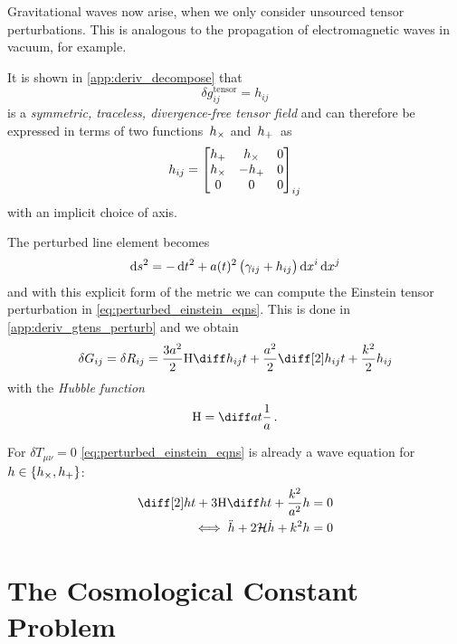 \documentclass[parskip=half]{scrreprt}
\begin{document}
Gravitational waves now arise, when we only consider unsourced tensor perturbations. This is analogous to the propagation of electromagnetic waves in vacuum, for example.

It is shown in \autoref{app:deriv_decompose} that
\begin{equation}
	\delta g^{\mathrm{tensor}}_{ij} = h_{ij}
\end{equation}
is a \emph{symmetric, traceless, divergence-free tensor field} and can therefore be expressed in terms of two functions~\(h_\times\) and~\(h_+\)~as
\begin{equation}
	h_{ij} =
	\begin{bmatrix}
		h_+ & h_\times & 0 \\
		h_\times & -h_+ & 0 \\
		0 & 0 & 0
	\end{bmatrix}_{ij}
\end{equation}
with an implicit choice of axis.

The perturbed line element becomes
\begin{equation}
	\dif{s}^2 = -\dif{t}^2 + a(t)^2 \del{\gamma_{ij} + h_{ij}} \dif{x^i}\dif{x^j}
\end{equation}
and with this explicit form of the metric we can compute the Einstein tensor perturbation in \autoref{eq:perturbed_einstein_eqns}. This is done in \autoref{app:deriv_gtens_perturb} and we obtain
\begin{align}\label{eq:evolution}
	\delta\Gtens_{ij} = \delta\Rtens_{ij} = \frac{3 a^2}{2} \Hcosm \dt{h_{ij}} + \frac{a^2}{2}\ddt{h_{ij}} + \frac{k^2}{2}h_{ij} \\
\end{align}
with the \emph{Hubble function}
\begin{equation}
	\Hcosm = \dt{a}\frac{1}{a} \, \textrm{.}
\end{equation}

For \(\delta T_{\mu \nu}=0\) \autoref{eq:perturbed_einstein_eqns} is already a wave equation  for \(h \in \cbr{\hcross, \hplus}\):
\begin{align}
	\ddt{h} + 3 \Hcosm \dt{h} + \frac{k^2}{a^2} h = 0 \\
	\iff \ddconf{h} + 2 \Hconf \dconf{h} + k^2 h = 0	
\end{align}

\section{The Cosmological Constant Problem}\label{sec:cc_problem} %
\end{document}
